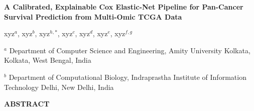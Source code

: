 \documentclass[10pt,a4paper]{article}
\begin{document}

{\LARGE\bfseries
A Calibrated, Explainable Cox Elastic-Net Pipeline for Pan-Cancer Survival Prediction from Multi-Omic TCGA Data
\par}

\vspace{1em}


{\large
xyz$^{a}$,
xyz$^{b}$,
xyz$^{h,*}$,
xyz$^{c}$,
xyz$^{d}$,
    xyz$^{e}$,
    xyz$^{f,g}$
\par}

\vspace{0.8em}


{\small

$^{a}$ Department of Computer Science and Engineering,
Amity University Kolkata, Kolkata, West Bengal, India

$^{b}$ Department of Computational Biology,
Indraprastha Institute of Information Technology Delhi,
New Delhi, India

}

\vspace{1.2em}

{\bfseries ABSTRACT\par}
\end{document}
